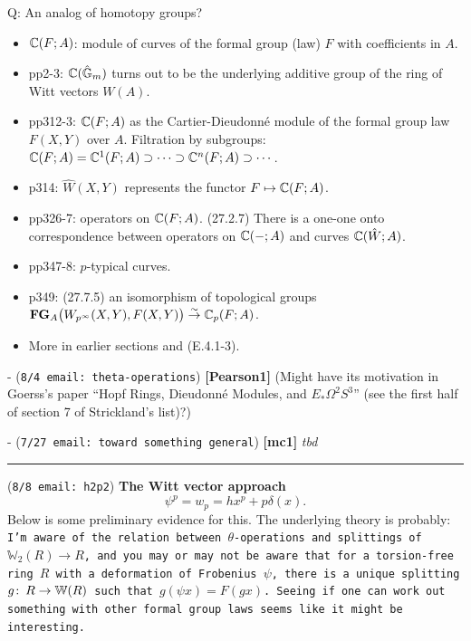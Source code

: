 \documentclass{rs}
\theoremstyle{definition}
\theoremstyle{remark}
\def\co{\colon\thinspace}
\newcommand{\mb}[1]{\mathbb{#1}}
\renewcommand{\=}{\approx}
\renewcommand{\-}{\sim}
\numberwithin{equation}{section}
\numberwithin{thm}{section}
\begin{document}
\begin{equation}
 \label{curves}
\end{equation}
Q: An analog of homotopy groups?
\begin{itemize}
 \item $\mathbb{C}(F;A)$: module of curves of the formal group (law) $F$ with coefficients in $A$.

 \item pp2-3: $\C(\hat{\mb G}_m)$ turns out to be the underlying additive group of the ring of Witt vectors $W(A)$.

 \item pp312-3: $\mathbb{C}(F;A)$ as the Cartier-Dieudonn\'e module of the formal group law $F(X,Y)$ over $A$. 
 Filtration by subgroups: $\mathbb{C}(F;A) = \mathbb{C}^1(F;A) \supset \cdots \supset \mathbb{C}^n(F;A) \supset \cdots$.

 \item p314: $\hat{W}(X,Y)$ represents the functor $F \mapsto \mathbb{C}(F;A)$.

 \item pp326-7: operators on $\mathbb{C}(F;A)$. (27.2.7) There is a one-one onto correspondence between operators on $\mathbb{C}(-;A)$ and curves $\mathbb{C}(\hat{W};A)$.

 \item pp347-8: $p$-typical curves.

 \item p349: (27.7.5) an isomorphism of topological groups $\textbf{FG}_A \big( W_{p^\infty}(X,Y), F(X,Y) \big) \stackrel{\sim}{\to} \mathbb{C}_p(F;A)$.

 \item More in earlier sections and (E.4.1-3).
\end{itemize}

- (\texttt{8/4 email: theta-operations}) \textbf{[Pearson1]} (Might have its motivation in Goerss's paper ``Hopf Rings, Dieudonn\'e Modules, and $E_*\Omega^
2S^3$'' (see the first half of section 7 of Strickland's list)?)

- (\texttt{7/27 email: toward something general}) \textbf{[mc1]} {\em tbd}
\\

\hrule

(\texttt{8/8 email: h2p2}) \textbf{The Witt vector approach}
\[
 \psi^p = w_p = h x^p + p \delta(x).
\]
Below is some preliminary evidence for this. The underlying theory is probably: 
\texttt{I'm aware of the relation between $\theta$-operations and splittings of
$\mathbb{W}_2(R) \to R$, and you may or may not be aware that for a torsion-free
ring $R$ with a deformation of Frobenius $\psi$, there is a unique
splitting $g\co R \to \mathbb{W}(R)$ such that $g(\psi x) = F(gx)$. Seeing if one can
work out something with other formal group laws seems like it might be
interesting.}
\end{document}

